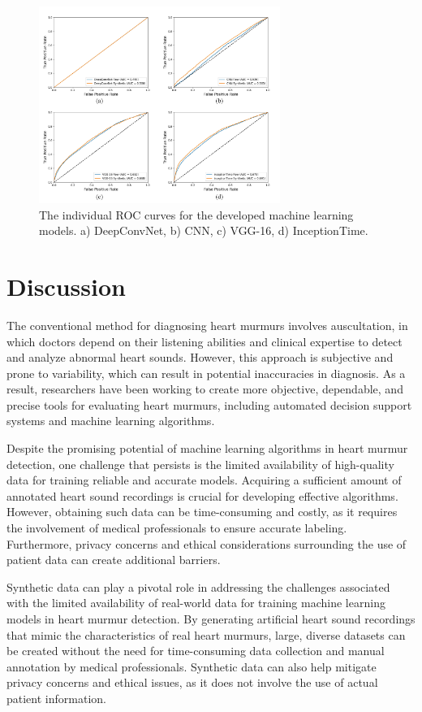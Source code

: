 \documentclass{article}
\begin{document}
\begin{figure}
\centering
    \includegraphics[width=0.7\textwidth]{Documents/ROCs.jpg}
    \caption{The individual ROC curves for the developed machine learning models. a) DeepConvNet, b) CNN, c) VGG-16, d) InceptionTime.}
    \label{fig:ROCs}

\end{figure}

\section{Discussion}
The conventional method for diagnosing heart murmurs involves auscultation, in which doctors depend on their listening abilities and clinical expertise to detect and analyze abnormal heart sounds. However, this approach is subjective and prone to variability, which can result in potential inaccuracies in diagnosis. As a result, researchers have been working to create more objective, dependable, and precise tools for evaluating heart murmurs, including automated decision support systems and machine learning algorithms.

\par Despite the promising potential of machine learning algorithms in heart murmur detection, one challenge that persists is the limited availability of high-quality data for training reliable and accurate models. Acquiring a sufficient amount of annotated heart sound recordings is crucial for developing effective algorithms. However, obtaining such data can be time-consuming and costly, as it requires the involvement of medical professionals to ensure accurate labeling. Furthermore, privacy concerns and ethical considerations surrounding the use of patient data can create additional barriers. 

\par Synthetic data can play a pivotal role in addressing the challenges associated with the limited availability of real-world data for training machine learning models in heart murmur detection. By generating artificial heart sound recordings that mimic the characteristics of real heart murmurs, large, diverse datasets can be created without the need for time-consuming data collection and manual annotation by medical professionals. Synthetic data can also help mitigate privacy concerns and ethical issues, as it does not involve the use of actual patient information.
\end{document}
